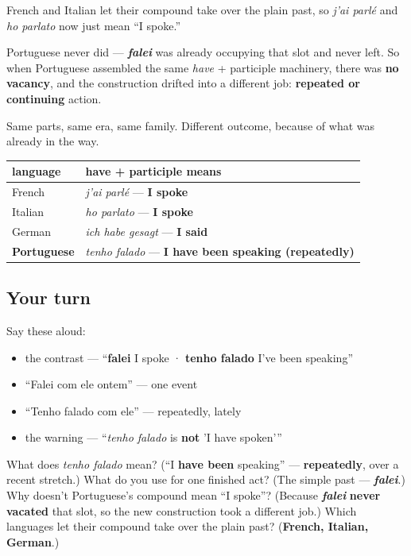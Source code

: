 \begin{culture}
French and Italian let their compound take over the plain past, so \emph{j'ai parlé} and \emph{ho parlato} now just mean \textquotedblleft{}I spoke.\textquotedblright{}

Portuguese never did — \emph{\textbf{falei}} was already occupying that slot and never left. So when Portuguese assembled the same \emph{have} + participle machinery, there was \textbf{no vacancy}, and the construction drifted into a different job: \textbf{repeated or continuing} action.

Same parts, same era, same family. Different outcome, because of what was already in the way.

\noindent
\begin{tabularx}{\linewidth}{@{}>{\raggedright\arraybackslash}X>{\raggedright\arraybackslash}X@{}}
\toprule
\textbf{language} & \textbf{have + participle means} \\
\midrule
French & \emph{j'ai parlé} — \textbf{I spoke} \\
Italian & \emph{ho parlato} — \textbf{I spoke} \\
German & \emph{ich habe gesagt} — \textbf{I said} \\
\textbf{Portuguese} & \emph{tenho falado} — \textbf{I have been speaking (repeatedly)} \\
\bottomrule
\end{tabularx}
\end{culture}

\subsection*{Your turn}
Say these aloud:

\begin{itemize}
\raggedright
  \item the contrast — \textquotedblleft{}\textbf{falei} I spoke · \textbf{tenho falado} I've been speaking\textquotedblright{}
  \item \textquotedblleft{}Falei com ele ontem\textquotedblright{} — one event
  \item \textquotedblleft{}Tenho falado com ele\textquotedblright{} — repeatedly, lately
  \item the warning — \textquotedblleft{}\emph{tenho falado} is \textbf{not} 'I have spoken'\textquotedblright{}
\end{itemize}

\begin{tcolorbox}[breakable,colback=teal!4,colframe=teal!35!black,title={Before you move on}]
What does \emph{tenho falado} mean? (\textquotedblleft{}I \textbf{have been} speaking\textquotedblright{} — \textbf{repeatedly}, over a recent stretch.) What do you use for one finished act? (The simple past — \emph{\textbf{falei}}.) Why doesn't Portuguese's compound mean \textquotedblleft{}I spoke\textquotedblright{}? (Because \emph{\textbf{falei}} \textbf{never vacated} that slot, so the new construction took a different job.) Which languages let their compound take over the plain past? (\textbf{French, Italian, German}.)
\end{tcolorbox}

